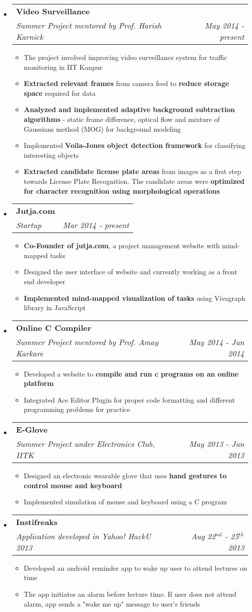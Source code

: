\documentclass[letterpaper,9pt]{extarticle}
\makeatletter
\newcommand{\resheading}[1]{%
  \noindent\fcolorbox{mygrey}{mygrey}{\makebox[\dimexpr\textwidth-2\fboxsep-2\fboxrule][l]{\textbf{~#1}}}%
}
\newcommand{\resitem}[1]{\item #1 \vspace{-3pt}}
\newcommand{\ressubheading}[4]{
\begin{tabular*}{6.5in}{l@{\extracolsep{\fill}}r}
		\textbf{#1} & #2 \\
		\textit{#3} & \textit{#4} \\
\end{tabular*}\vspace{-6pt}}
\makeatother
\begin{document}
\resheading{Projects}
\begin{itemize}
\item
	\ressubheading{Video Surveillance}{}{Summer Project mentored by Prof. Harish Karnick}{May 2014 - present}
	\begin{itemize}
		\resitem{The project involved improving video surveillance system for traffic monitoring in IIT Kanpur}
		\resitem{\textbf{Extracted relevant frames} from camera feed to \textbf{reduce storage space} required for data }
		\resitem{\textbf{Analyzed and implemented adaptive background subtraction algorithms} - static frame difference, optical flow and mixture of Gaussians method (MOG) for background modeling}
		\resitem{Implemented \textbf{Voila-Jones object detection framework} for classifying interesting objects}		
		\resitem{\textbf{Extracted candidate license plate areas} from images as a first step towards License Plate Recognition. The candidate areas were \textbf{optimized for character recognition using morphological operations}}
	\end{itemize}
\item
	\ressubheading{Jutja.com}{}{Startup}{Mar 2014 - present}
	\begin{itemize}
		\resitem{\textbf{Co-Founder of jutja.com}, a project management website with mind-mapped tasks}
		\resitem{Designed the user interface of website and currently working as a front end developer}
		\resitem{\textbf{Implemented mind-mapped visualization of tasks} using Vivagraph library in JavaScript}
	\end{itemize}
\item
	\ressubheading{Online C Compiler}{}{Summer Project mentored by Prof. Amay Karkare}{May 2014 - Jun 2014}
	\begin{itemize}
		\resitem{Developed a website to \textbf{compile and run c programs on an online platform}}
		\resitem{Integrated Ace Editor Plugin for proper code formatting and different programming problems for practice}
	\end{itemize}
\item
	\ressubheading{E-Glove}{}{Summer Project under Electronics Club, IITK}{May 2013 - Jun 2013}
	\begin{itemize}
		\resitem{Designed an electronic wearable glove that uses \textbf{hand gestures to control mouse and keyboard}}
		\resitem{Implemented simulation of mouse and keyboard using a C program}
	\end{itemize}
\item
	\ressubheading{Instifreaks}{}{Application developed in Yahoo! HackU 2013}{Aug 22$^{nd}$ - 25$^{th}$ 2013}
	\begin{itemize}
		\resitem{Developed an android reminder app to wake up user to attend lectures on time}
		\resitem{The app initiates an alarm before lecture time. If user does not attend alarm, app sends a "wake me up" message to user's friends}
	\end{itemize}
\end{itemize}
\end{document}
